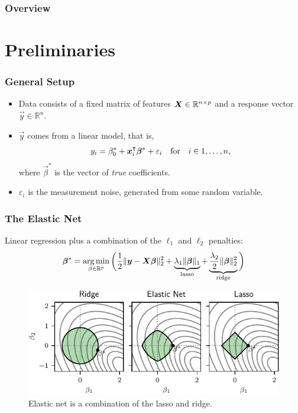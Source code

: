 \documentclass[aspectratio=1610,onlytextwidth]{beamer}
\begin{document}
\begin{frame}
  \frametitle{Overview}

  \tableofcontents
\end{frame}

\section{Preliminaries}

\begin{frame}
  \frametitle{General Setup}

  \begin{itemize}
    \item Data consists of a \alert{fixed} matrix of features \(\boldsymbol{X} \in \mathbb{R}^{n \times p}\)
          and a response vector \(\vec{y} \in \mathbb{R}^n\).
    \item \(\vec{y}\) comes from a linear model, that is,
          \[
            y_i = \beta_0^* + \boldsymbol x_i^\intercal \boldsymbol\beta^* + \varepsilon_i \quad\text{for} \quad i \in 1,\dots,n,
          \]
          where \(\vec{\beta}^*\) is the vector of \emph{true} coefficients.
    \item \(\varepsilon_i\) is the measurement noise, generated from some random variable.
  \end{itemize}
\end{frame}

\begin{frame}[c]
  \frametitle{The Elastic Net}

  Linear regression plus a combination of the \(\ell_1\) and \(\ell_2\) penalties:
  \begin{equation*}
    \boldsymbol{\beta}^* = \operatorname*{arg\,min}_{\beta \in \mathbb{R}^p} \bigg( \frac{1}{2} \lVert \boldsymbol y - \boldsymbol{X}\boldsymbol{\beta} \rVert^2_2  + \underbrace{\lambda_1 \lVert \boldsymbol\beta \rVert_1}_\text{lasso} + \underbrace{\frac{\lambda_2}{2}\lVert \boldsymbol \beta \rVert_2^2}_\text{ridge}\bigg)
  \end{equation*}

  \pause

  \begin{figure}
    \centering
    \includegraphics[]{figures/elasticnet-balls.pdf}
    \caption{%
      Elastic net is a combination of the lasso and ridge.
    }
  \end{figure}
\end{frame}
\end{document}
